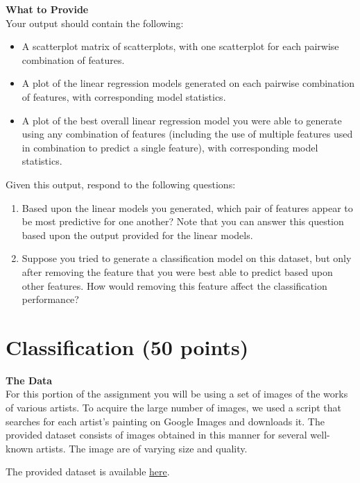 \documentclass[paper=a4, fontsize=11pt]{scrartcl} %
\numberwithin{equation}{section} %
\numberwithin{figure}{section} %
\numberwithin{table}{section} %
\begin{document}
\textbf{What to Provide}\\
Your output should contain the following:
\begin{itemize}
\item A scatterplot matrix of scatterplots, with one scatterplot for each pairwise combination of features.
\item A plot of the linear regression models generated on each pairwise combination of features, with corresponding model statistics.
\item A plot of the best overall linear regression model you were able to generate using any combination of features (including the use of multiple features used in combination to predict a single feature), with corresponding model statistics.
\end{itemize}
Given this output, respond to the following questions:
\begin{enumerate}
\item Based upon the linear models you generated, which pair of features appear to be most predictive for one another? Note that you can answer this question based upon the output provided for the linear models.
\item Suppose you tried to generate a classification model on this dataset, but only after removing the feature that you were best able to predict based upon other features. How would removing this feature affect the classification performance?
\end{enumerate}

\newpage

\section{Classification (50 points)}

\textbf{The Data}\\
For this portion of the assignment you will be using a set of images of the works of various artists. To acquire the large number of images, we used a script that searches for each artist's painting on Google Images and downloads it. The provided dataset consists of images obtained in this manner for several well-known artists. The image are of varying size and quality.

\vspace{6pt}

The provided dataset is available \href{https://github.com/cse40647/cse40647/blob/sp.14/assignment3/paintings.zip}{here}.

\vspace{6pt}
\end{document}
